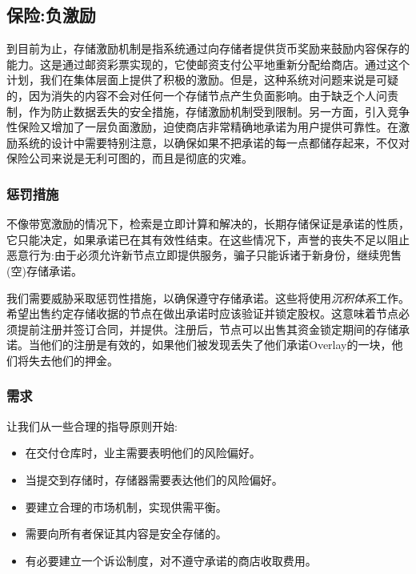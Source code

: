 \subsection{保险:负激励\statusorange}\label{sec:chunk-insurance}


到目前为止，存储激励机制是指系统通过向存储者提供货币奖励来鼓励内容保存的能力。这是通过邮资彩票实现的，它使邮资支付公平地重新分配给商店。通过这个计划，我们在集体层面上提供了积极的激励。但是，这种系统对问题来说是可疑的，因为消失的内容不会对任何一个存储节点产生负面影响。由于缺乏个人问责制，作为防止数据丢失的安全措施，存储激励机制受到限制。另一方面，引入竞争性保险又增加了一层负面激励，迫使商店非常精确地承诺为用户提供可靠性。在激励系统的设计中需要特别注意，以确保如果不把承诺的每一点都储存起来，不仅对保险公司来说是无利可图的，而且是彻底的灾难。 

\subsubsection{惩罚措施}

不像带宽激励的情况下，检索是立即计算和解决的，长期存储保证是承诺的性质，它只能决定，如果承诺已在其有效性结束。在这些情况下，声誉的丧失不足以阻止恶意行为:由于必须允许新节点立即提供服务，骗子只能诉诸于新身份，继续兜售(空)存储承诺。

我们需要威胁采取惩罚性措施，以确保遵守存储承诺。这些将使用\emph{沉积体系}工作。希望出售约定存储收据的节点在做出承诺时应该验证并锁定股权。这意味着节点必须提前注册并签订合同，并提供。注册后，节点可以出售其资金锁定期间的存储承诺。当他们的注册是有效的，如果他们被发现丢失了他们承诺Overlay的一块，他们将失去他们的押金。

\subsubsection{需求}

让我们从一些合理的指导原则开始:

\begin{itemize}
\item 在交付仓库时，业主需要表明他们的风险偏好。
\item 当提交到存储时，存储器需要表达他们的风险偏好。
\item 要建立合理的市场机制，实现供需平衡。
\item 需要向所有者保证其内容是安全存储的。
\item 有必要建立一个诉讼制度，对不遵守承诺的商店收取费用。
\end{itemize}

